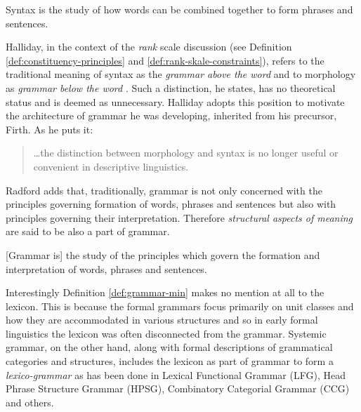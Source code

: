     \begin{definition}\label{def:syntax-min}
    Syntax is the study of how words can be combined together to form phrases and sentences. \citep[1]{Radford1997}
    \end{definition}

    Halliday, in the context of the \textit{rank} scale discussion (see Definition \ref{def:constituency-principles} and \ref{def:rank-skale-constraints}), refers to the traditional meaning of syntax as the \textit{grammar above the word} and to morphology as \textit{grammar below the word} \citep[ 51]{Halliday2002}. Such a distinction, he states, has no theoretical status and is deemed as unnecessary. Halliday adopts this position to motivate the architecture of grammar he was developing, inherited from his precursor, Firth. As he puts it: 
    \begin{quote}
    	\dots the distinction between morphology and syntax is no longer useful or convenient in descriptive linguistics. \citep[14]{Firth1957}
    \end{quote}
    
    
    Radford adds that, traditionally, grammar is not only concerned with the principles governing formation of words, phrases and sentences but also with principles governing their interpretation. Therefore \textit{structural aspects of meaning} are said to be also a part of grammar. 
    
    \begin{definition}\label{def:grammar-min}
    [Grammar is] the study of the principles which govern the formation and interpretation of words, phrases and sentences. \citep[1]{Radford1997}
    \end{definition}
    
    Interestingly Definition \ref{def:grammar-min} makes no mention at all to the lexicon. This is because the formal grammars focus primarily on unit classes and how they are accommodated in various structures and so in early formal linguistics the lexicon was often disconnected from the grammar. Systemic grammar, on the other hand, along with formal descriptions of grammatical categories and structures, includes the lexicon as part of grammar to form a \textit{lexico-grammar} as has been done in
    Lexical Functional Grammar (LFG), Head Phrase Structure Grammar (HPSG), Combinatory Categorial Grammar (CCG) and others.    

